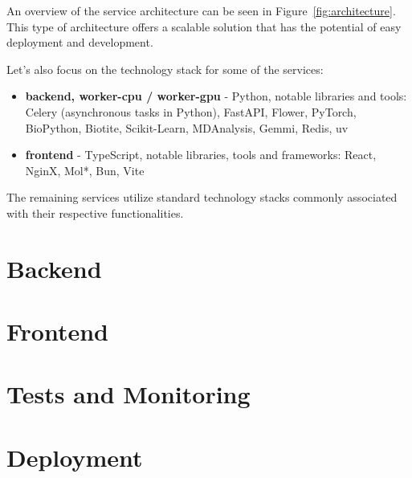 An overview of the service architecture can be seen in Figure~\ref{fig:architecture}. This type of architecture offers a scalable solution that has the potential of easy deployment and development.

Let's also focus on the technology stack for some of the services:

\begin{itemize}
    \item \textbf{backend, worker-cpu / worker-gpu} - Python, notable libraries and tools: Celery (asynchronous tasks in Python), FastAPI, Flower, PyTorch, BioPython, Biotite, Scikit-Learn, MDAnalysis, Gemmi, Redis, uv
    \item \textbf{frontend} - TypeScript, notable libraries, tools and frameworks: React, NginX, Mol*, Bun, Vite
\end{itemize}

The remaining services utilize standard technology stacks commonly associated with their respective functionalities.

\section{Backend}
\label{sec:backend}


\section{Frontend}
\label{sec:frontend}



\section{Tests and Monitoring}
\label{sec:tests-monitoring}



\section{Deployment}
\label{sec:deployment}

